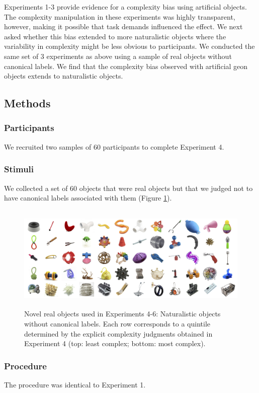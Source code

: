 Experiments 1-3 provide evidence for a complexity bias using artificial objects. The complexity manipulation in these experiments was highly transparent, however, making it possible that task demands influenced the effect. We next asked whether this bias extended to more naturalistic objects where the variability in complexity might be less obvious to participants. We conducted the same set of 3 experiments as above using a sample of real objects without canonical labels. We find that the complexity bias observed with artificial geon objects extends to naturalistic objects.

\subsection{Methods}
\subsubsection{Participants} We recruited two samples of 60 participants to complete Experiment 4.

\subsubsection{Stimuli}
We collected a set of 60 objects that were real objects but that we judged not to have canonical labels associated with them (Figure \ref{fig:realobjs}).

\begin{figure}
 \begin{center}
  \includegraphics[height=2in]{figs/realobjs_stimuli.png}
  \caption{\label{fig:realobjs} Novel real objects used in Experiments 4-6: Naturalistic objects without canonical labels. Each row corresponds to a quintile determined by the explicit complexity judgments obtained in Experiment 4 (top: least complex; bottom: most complex).}
 \end{center}
\end{figure}

\subsubsection{Procedure} The procedure was identical to Experiment 1.

